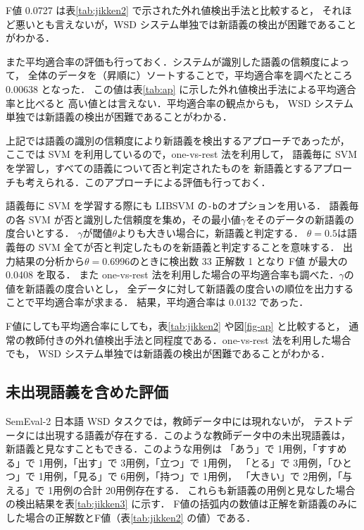 \documentclass[japanese]{jnlp_1.4}
\begin{document}
F値 0.0727 は表\ref{tab:jikken2} で示された外れ値検出手法と比較すると，
それほど悪いとも言えないが，WSD システム単独では新語義の検出が困難であることがわかる．

また平均適合率の評価も行っておく．システムが識別した語義の信頼度によって，
全体のデータを（昇順に）ソートすることで，平均適合率を調べたところ 0.00638 となった．
この値は表\ref{tab:ap} に示した外れ値検出手法による平均適合率と比べると
高い値とは言えない．平均適合率の観点からも，
WSD システム単独では新語義の検出が困難であることがわかる．

上記では語義の識別の信頼度により新語義を検出するアプローチであったが，
ここでは SVM を利用しているので，one-vs-rest 法を利用して，
語義毎に SVM を学習し，すべての語義について否と判定されたものを
新語義とするアプローチも考えられる．このアプローチによる評価も行っておく．

語義毎に SVM を学習する際にも LIBSVM の\verb|-b|のオプションを用いる．
語義毎の各 SVM が否と識別した信頼度を集め，その最小値\( \gamma \)をそのデータの新語義の度合いとする．
\( \gamma \)が閾値\( \theta \)よりも大きい場合に，新語義と判定する．
\( \theta = 0.5 \)は語義毎の SVM 全てが否と判定したものを新語義と判定することを意味する．
出力結果の分析から\(\theta = 0.6996\)のときに検出数 33 正解数 1 となり F値 が最大の 0.0408 を取る．
また one-vs-rest 法を利用した場合の平均適合率も調べた．\( \gamma \)の値を新語義の度合いとし，
全データに対して新語義の度合いの順位を出力することで平均適合率が求まる．
結果，平均適合率は 0.0132 であった．

F値にしても平均適合率にしても，表\ref{tab:jikken2} や図\ref{fig-ap} と比較すると，
通常の教師付きの外れ値検出手法と同程度である．one-vs-rest 法を利用した場合でも，
WSD システム単独では新語義の検出が困難であることがわかる．


\subsection{未出現語義を含めた評価}

SemEval-2 日本語 WSD タスクでは，教師データ中には現れないが，
テストデータには出現する語義が存在する．このような教師データ中の未出現語義は，
新語義と見なすこともできる．このような用例は
「あう」で 1用例，「すすめる」で 1用例，「出す」で 3用例，「立つ」で 1用例，
「とる」で 3用例，「ひとつ」で 1用例，「見る」で 6用例，「持つ」で 1用例，
「大きい」で 2用例，「与える」で 1用例の合計 20用例存在する．
これらも新語義の用例と見なした場合の検出結果を表\ref{tab:jikken3} に示す．
F値の括弧内の数値は正解を新語義のみにした場合の正解数とF値（表\ref{tab:jikken2} の値）である．
\end{document}
